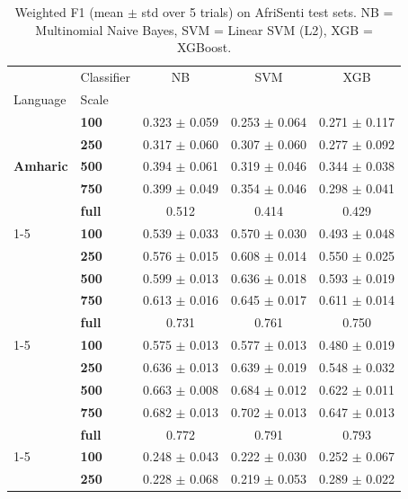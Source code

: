 \begin{table}[t]
\caption{Weighted F1 (mean $\pm$ std over 5 trials) on AfriSenti test sets. NB = Multinomial Naive Bayes, SVM = Linear SVM (L2), XGB = XGBoost.}
\label{tab:main_results}
\begin{tabular}{llccc}
\toprule
 & Classifier & NB & SVM & XGB \\
Language & Scale &  &  &  \\
\midrule
\multirow[t]{5}{*}{\textbf{Amharic}} & \textbf{100} & 0.323 $\pm$ 0.059 & 0.253 $\pm$ 0.064 & 0.271 $\pm$ 0.117 \\
\textbf{} & \textbf{250} & 0.317 $\pm$ 0.060 & 0.307 $\pm$ 0.060 & 0.277 $\pm$ 0.092 \\
\textbf{} & \textbf{500} & 0.394 $\pm$ 0.061 & 0.319 $\pm$ 0.046 & 0.344 $\pm$ 0.038 \\
\textbf{} & \textbf{750} & 0.399 $\pm$ 0.049 & 0.354 $\pm$ 0.046 & 0.298 $\pm$ 0.041 \\
\textbf{} & \textbf{full} & 0.512 & 0.414 & 0.429 \\
\cline{1-5}
\multirow[t]{5}{*}{\textbf{Hausa}} & \textbf{100} & 0.539 $\pm$ 0.033 & 0.570 $\pm$ 0.030 & 0.493 $\pm$ 0.048 \\
\textbf{} & \textbf{250} & 0.576 $\pm$ 0.015 & 0.608 $\pm$ 0.014 & 0.550 $\pm$ 0.025 \\
\textbf{} & \textbf{500} & 0.599 $\pm$ 0.013 & 0.636 $\pm$ 0.018 & 0.593 $\pm$ 0.019 \\
\textbf{} & \textbf{750} & 0.613 $\pm$ 0.016 & 0.645 $\pm$ 0.017 & 0.611 $\pm$ 0.014 \\
\textbf{} & \textbf{full} & 0.731 & 0.761 & 0.750 \\
\cline{1-5}
\multirow[t]{5}{*}{\textbf{Igbo}} & \textbf{100} & 0.575 $\pm$ 0.013 & 0.577 $\pm$ 0.013 & 0.480 $\pm$ 0.019 \\
\textbf{} & \textbf{250} & 0.636 $\pm$ 0.013 & 0.639 $\pm$ 0.019 & 0.548 $\pm$ 0.032 \\
\textbf{} & \textbf{500} & 0.663 $\pm$ 0.008 & 0.684 $\pm$ 0.012 & 0.622 $\pm$ 0.011 \\
\textbf{} & \textbf{750} & 0.682 $\pm$ 0.013 & 0.702 $\pm$ 0.013 & 0.647 $\pm$ 0.013 \\
\textbf{} & \textbf{full} & 0.772 & 0.791 & 0.793 \\
\cline{1-5}
\multirow[t]{5}{*}{\textbf{Oromo}} & \textbf{100} & 0.248 $\pm$ 0.043 & 0.222 $\pm$ 0.030 & 0.252 $\pm$ 0.067 \\
\textbf{} & \textbf{250} & 0.228 $\pm$ 0.068 & 0.219 $\pm$ 0.053 & 0.289 $\pm$ 0.022 \\

\end{tabular}
\end{table}
